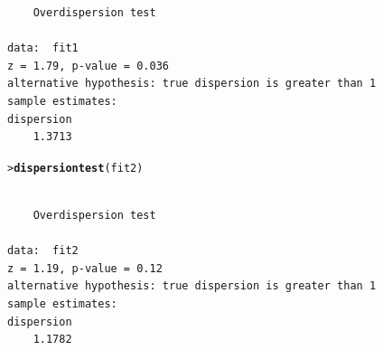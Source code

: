 \documentclass[10pt]{report}\usepackage[]{graphicx}\usepackage[]{color}
\makeatletter
\newcommand{\hlstd}[1]{\textcolor[rgb]{0.345,0.345,0.345}{#1}}%
\newcommand{\hlkwd}[1]{\textcolor[rgb]{0.737,0.353,0.396}{\textbf{#1}}}%
\newenvironment{kframe}{%
 \def\at@end@of@kframe{}%
 \ifinner\ifhmode%
  \def\at@end@of@kframe{\end{minipage}}%
  \begin{minipage}{\columnwidth}%
 \fi\fi%
 \def\FrameCommand##1{\hskip\@totalleftmargin \hskip-\fboxsep
 \colorbox{shadecolor}{##1}\hskip-\fboxsep
     \hskip-\linewidth \hskip-\@totalleftmargin \hskip\columnwidth}%
 \MakeFramed {\advance\hsize-\width
   \@totalleftmargin\z@ \linewidth\hsize
   \@setminipage}}%
 {\par\unskip\endMakeFramed%
 \at@end@of@kframe}
\newenvironment{knitrout}{}{} %
\renewenvironment{knitrout}{\small\renewcommand{\baselinestretch}{.85}}{} %
\makeatother
\begin{document}
\begin{Exercises}
\begin{enumerate*}
\begin{ans}
\begin{knitrout}
\begin{kframe}
\begin{verbatim}
	Overdispersion test

data:  fit1
z = 1.79, p-value = 0.036
alternative hypothesis: true dispersion is greater than 1
sample estimates:
dispersion 
    1.3713 
\end{verbatim}
\begin{alltt}
\hlstd{> }\hlkwd{dispersiontest}\hlstd{(fit2)}
\end{alltt}
\begin{verbatim}

	Overdispersion test

data:  fit2
z = 1.19, p-value = 0.12
alternative hypothesis: true dispersion is greater than 1
sample estimates:
dispersion 
    1.1782 
\end{verbatim}
\end{kframe}
\end{knitrout}

    \end{ans}
    
	\end{enumerate*}		


\end{Exercises}
\end{document}
